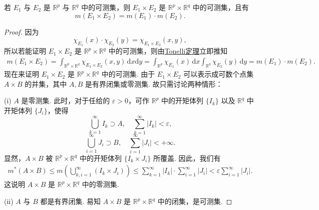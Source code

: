 \documentclass[../../main.tex]{subfiles}
\begin{document}
\begin{theorem}
若 \( E_1 \) 与 \( E_2 \) 是 \( \mathbb{R}^p \) 与 \( \mathbb{R}^q \) 中的可测集，则 \( E_1 \times E_2 \) 是 \( \mathbb{R}^p \times \mathbb{R}^q \) 中的可测集，且有
\[
m(E_1 \times E_2) = m(E_1) \cdot m(E_2).
\]
\end{theorem}
\begin{proof}
因为
\[
\chi_{E_1}(x) \cdot \chi_{E_2}(y) = \chi_{E_1 \times E_2}(x, y),
\]
所以若能证明 \( E_1 \times E_2 \) 是 \( \mathbb{R}^p \times \mathbb{R}^q \) 中的可测集，则由\hyperref[theorem:Tonelli 定理 非负可测函数的情形]{Tonelli定理}立即推知
\begin{align*}
m(E_1 \times E_2) = \int_{\mathbb{R}^p \times \mathbb{R}^q} \chi_{E_1 \times E_2}(x, y) \, \mathrm{d}x\mathrm{d}y 
= \int_{\mathbb{R}^p} \chi_{E_1}(x) \, \mathrm{d}x \int_{\mathbb{R}^q} \chi_{E_2}(y) \, \mathrm{d}y = m(E_1) \cdot m(E_2).
\end{align*}
现在来证明 \( E_1 \times E_2 \) 是 \( \mathbb{R}^p \times \mathbb{R}^q \) 中的可测集. 由于 \( E_1 \times E_2 \) 可以表示成可数个点集 \( A \times B \) 的并集，其中 \( A, B \) 是有界闭集或零测集. 故只需讨论两种情形：

(i) \( A \) 是零测集. 此时，对于任给的 \( \varepsilon > 0 \)，可作 \( \mathbb{R}^p \) 中的开矩体列 \( \{ I_k \} \) 以及 \( \mathbb{R}^q \) 中开矩体列 \( \{ J_i \} \)，使得
\[
\bigcup_{k = 1}^{\infty} I_k \supset A, \quad \sum_{k = 1}^{\infty} |I_k| < \varepsilon,
\]
\[
\bigcup_{i = 1}^{\infty} J_i \supset B, \quad \sum_{i = 1}^{\infty} |J_i| < +\infty.
\]
显然，\( A \times B \) 被 \( \mathbb{R}^p \times \mathbb{R}^q \) 中的开矩体列 \( \{ I_k \times J_i \} \) 所覆盖. 因此，我们有
\begin{align*}
m^*(A \times B) \leqslant m\left( \bigcup_{k, i = 1}^{\infty} (I_k \times J_i) \right) 
\leqslant \sum_{k = 1}^{\infty} |I_k| \cdot \sum_{i = 1}^{\infty} |J_i| < \varepsilon \sum_{i = 1}^{\infty} |J_i|.
\end{align*}
这说明 \( A \times B \) 是 \( \mathbb{R}^p \times \mathbb{R}^q \) 中的零测集.

(ii) \( A \) 与 \( B \) 都是有界闭集. 易知 \( A \times B \) 是 \( \mathbb{R}^p \times \mathbb{R}^q \) 中的闭集，是可测集.

\end{proof}
\end{document}
